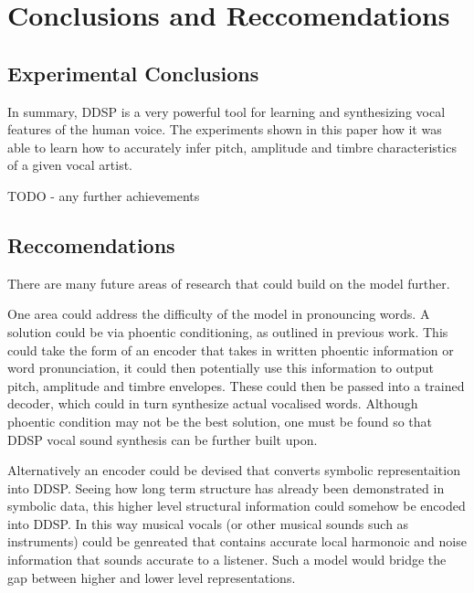 \chapter{Conclusions and Reccomendations}

\section{Experimental Conclusions}

In summary, DDSP is a very powerful tool for learning and synthesizing vocal features of the human voice. The experiments shown in this paper how it was able to learn how to accurately infer pitch, amplitude and timbre characteristics of a given vocal artist.

TODO - any further achievements

\section{Reccomendations}

There are many future areas of research that could build on the model further.

One area could address the difficulty of the model in pronouncing words. A solution could be via phoentic conditioning, as outlined in previous work\cite{SingingDDSP}. This could take the form of an encoder that takes in written phoentic information or word pronunciation, it could then potentially use this information to output pitch, amplitude and timbre envelopes. These could then be passed into a trained decoder, which could in turn synthesize actual vocalised words. Although phoentic condition may not be the best solution, one must be found so that DDSP vocal sound synthesis can be further built upon.

Alternatively an encoder could be devised that converts symbolic representaition into DDSP. Seeing how long term structure has already been demonstrated in symbolic data\cite{Attention}, this higher level structural information could somehow be encoded into DDSP. In this way musical vocals (or other musical sounds such as instruments) could be genreated that contains accurate local harmonoic and noise information that sounds accurate to a listener. Such a model would bridge the gap between higher and lower level representations.